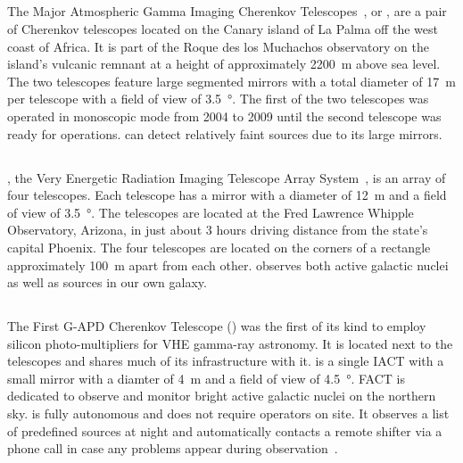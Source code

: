 \subsection{\magic}
The Major Atmospheric Gamma Imaging Cherenkov Telescopes~\cite{magic}, or \magic, are a pair of Cherenkov telescopes located on the Canary island of La Palma off the west coast of Africa.
It is part of the Roque des los Muchachos observatory on the island's vulcanic remnant at a height of approximately \SI{2200}{\metre} above sea level.
The two telescopes feature large segmented mirrors with a total diameter of \SI{17}{\metre} per telescope with a field of view of \SI{3.5}{\degree}. 
The first of the two telescopes was operated in monoscopic mode from 2004 to 2009 until the second telescope was ready for operations. 
\magic can detect relatively faint sources due to its large mirrors. 

\subsection{\veritas}
\veritas, the Very Energetic Radiation Imaging Telescope Array System~\cite{veritas}, is an array of 
four telescopes. Each telescope has a mirror with a diameter of \SI{12}{\metre} and a field of view of \SI{3.5}{\degree}. The \veritas 
telescopes are located at the Fred Lawrence Whipple Observatory, Arizona, in just about 3 hours driving distance from the state's capital Phoenix.
The four telescopes are located on the corners of a rectangle approximately \SI{100}{\metre} apart from each other. \veritas observes both active galactic nuclei 
as well as sources in our own galaxy.  

\subsection{\fact}
The First G-APD Cherenkov Telescope (\fact) was the first of its kind to employ silicon photo-multipliers for VHE gamma-ray astronomy. 
It is located next to the \magic telescopes and shares much of its infrastructure with it. \fact is a single IACT with a small mirror with a diamter of \SI{4}{\metre} 
and a field of view of \SI{4.5}{\degree}.
FACT is dedicated to observe and monitor bright active galactic nuclei on the northern sky. \fact is fully autonomous and does not require operators
on site. It observes a list of predefined sources at night and automatically contacts a remote shifter via a phone call in case any problems 
appear during observation~\cite{fact_robotic}. 

